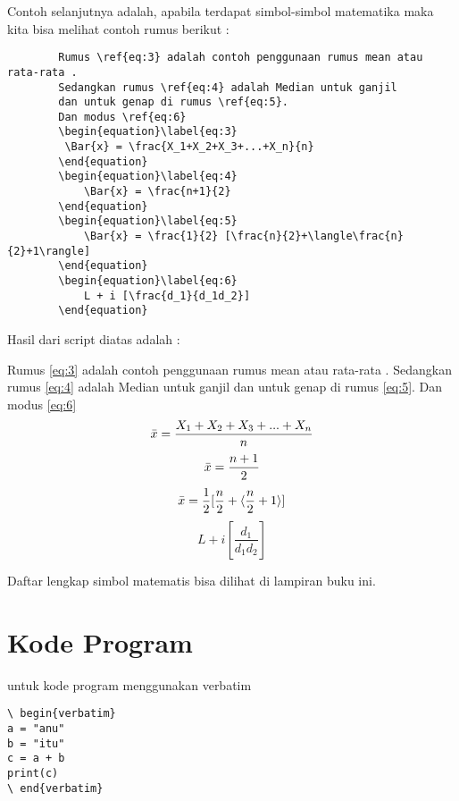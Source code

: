 Contoh selanjutnya adalah, apabila terdapat simbol-simbol matematika maka kita bisa melihat contoh rumus berikut :

    \begin{verbatim}
		Rumus \ref{eq:3} adalah contoh penggunaan rumus mean atau rata-rata .
		Sedangkan rumus \ref{eq:4} adalah Median untuk ganjil  
		dan untuk genap di rumus \ref{eq:5}.
		Dan modus \ref{eq:6}
		\begin{equation}\label{eq:3}
		 \Bar{x} = \frac{X_1+X_2+X_3+...+X_n}{n}    
		\end{equation}
		\begin{equation}\label{eq:4}
		    \Bar{x} = \frac{n+1}{2}
		\end{equation}
		\begin{equation}\label{eq:5}
		    \Bar{x} = \frac{1}{2} [\frac{n}{2}+\langle\frac{n}{2}+1\rangle]
		\end{equation}
		\begin{equation}\label{eq:6}
		    L + i [\frac{d_1}{d_1d_2}]
		\end{equation}
    \end{verbatim}

Hasil dari script diatas adalah :

Rumus \ref{eq:3} adalah contoh penggunaan rumus mean atau rata-rata .
Sedangkan rumus \ref{eq:4} adalah Median untuk ganjil  
dan untuk genap di rumus \ref{eq:5}.
Dan modus \ref{eq:6}
\begin{equation}\label{eq:3}
 \Bar{x} = \frac{X_1+X_2+X_3+...+X_n}{n}    
\end{equation}
\begin{equation}\label{eq:4}
    \Bar{x} = \frac{n+1}{2}
\end{equation}
\begin{equation}\label{eq:5}
    \Bar{x} = \frac{1}{2} [\frac{n}{2}+\langle\frac{n}{2}+1\rangle]
\end{equation}
\begin{equation}\label{eq:6}
    L + i [\frac{d_1}{d_1d_2}]
\end{equation}

Daftar lengkap simbol matematis bisa dilihat di lampiran buku ini.



\section{Kode Program}
untuk kode program menggunakan verbatim
\begin{verbatim}
\ begin{verbatim}
a = "anu"
b = "itu"
c = a + b
print(c) 
\ end{verbatim}
\end{verbatim}





  
